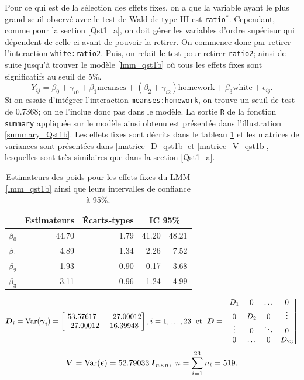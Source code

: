 \documentclass{article}
\begin{document}
		Pour ce qui est de la sélection des effets fixes, on a que la variable ayant le plus grand seuil observé avec le test de Wald de type III est \texttt{ratio}$^*$. Cependant, comme pour la section \ref{Qst1_a}, on doit gérer les variables d'ordre supérieur qui dépendent de celle-ci avant de pouvoir la retirer. On commence donc par retirer l'interaction \texttt{white:ratio2}. Puis, on refait le test pour retirer \texttt{ratio2}; ainsi de suite jusqu'à trouver le modèle \eqref{lmm_qst1b} où tous les effets fixes sont significatifs au seuil de 5\%.
		\begin{equation}\label{lmm_qst1b}
			Y_{ij} = \beta_0 + \gamma_{i0} + \beta_1 \mathrm{meanses} + (\beta_2 + \gamma_{i2}) \mathrm{homework} + \beta_3\mathrm{white} + \epsilon_{ij}.
		\end{equation}
		Si on essaie d'intégrer l'interaction \texttt{meanses:homework}, on trouve un seuil de test de 0.7368; on ne l'inclue donc pas dans le modèle.		
		La sortie \texttt{R} de la fonction \texttt{summary} appliquée sur le modèle ainsi obtenu est présentée dans l'illustration \ref{summary_Qst1b}. Les effets fixes sont décrits dans le tableau \ref{tbl_effets_fixes_qst1b} et les matrices de variances sont présentées dans \eqref{matrice_D_qst1b} et \eqref{matrice_V_qst1b}, lesquelles sont très similaires que dans la section \ref{Qst1_a}.
		\begin{table}[ht]
			\centering
			\begin{tabular}{lrrrr}
				\hline
				& Estimateurs & Écarts-types &  \multicolumn{2}{c}{IC 95\%} \\ 
				\hline
				$\beta_0$ & 44.70 & 1.79 & 41.20 & 48.21 \\ 
				$\beta_1$ & 4.89 & 1.34 & 2.26 & 7.52 \\ 
				$\beta_2$ & 1.93 & 0.90 & 0.17 & 3.68 \\ 
				$\beta_3$ & 3.11 & 0.96 & 1.24 & 4.99 \\ 
				\hline
			\end{tabular}
		\caption{Estimateurs des poids pour les effets fixes du LMM \eqref{lmm_qst1b} ainsi que leurs intervalles de confiance à 95\%.}
		\label{tbl_effets_fixes_qst1b}
		\end{table}
		\begin{align}\label{matrice_D_qst1b}
			\boldsymbol{D}_i = \mathrm{Var}(\boldsymbol{\gamma}_i) = 
			\begin{bmatrix}
				53.57617 & -27.00012 \\
				-27.00012& 16.39948  \\
			\end{bmatrix},
			i=1,\dots,23
			\; \text{ et }\;
			\boldsymbol{D} = 
			\begin{bmatrix}
				D_1 & 0 & \dots & 0 \\
				0 & D_2 & 0 & \vdots \\
				\vdots & 0 & \ddots & 0 \\
				0 & \dots & 0 & D_{23}
			\end{bmatrix}
		\end{align}
		\begin{align}\label{matrice_V_qst1b}
			\boldsymbol{V} = \mathrm{Var}(\boldsymbol{\epsilon}) = 
			52.79033\, \boldsymbol{I}_{n\times n},
			\ n=\sum_{i=1}^{23} n_i = 519.
		\end{align}
\end{document}
